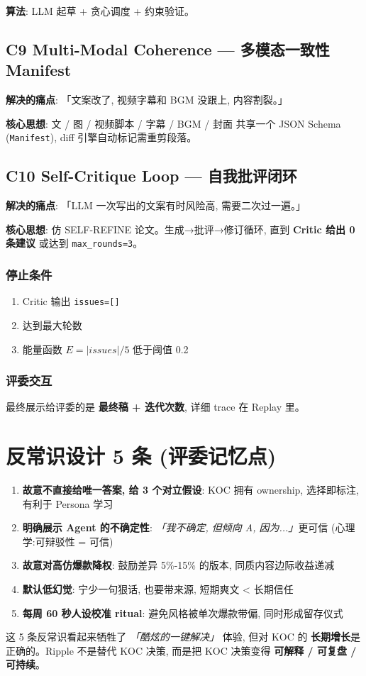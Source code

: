 \textbf{算法}: LLM 起草 + 贪心调度 + 约束验证。

\subsection{C9 Multi-Modal Coherence — 多模态一致性 Manifest}

\textbf{解决的痛点}: 「文案改了, 视频字幕和 BGM 没跟上, 内容割裂。」

\textbf{核心思想}: 文 / 图 / 视频脚本 / 字幕 / BGM / 封面 共享一个 JSON Schema (\texttt{Manifest}), diff 引擎自动标记需重剪段落。

\subsection{C10 Self-Critique Loop — 自我批评闭环}

\textbf{解决的痛点}: 「LLM 一次写出的文案有时风险高, 需要二次过一遍。」

\textbf{核心思想}: 仿 SELF-REFINE 论文。生成→批评→修订循环, 直到 \textbf{Critic 给出 0 条建议} 或达到 \texttt{max\_rounds=3}。

\subsubsection{停止条件}

\begin{enumerate}
    \item Critic 输出 \texttt{issues=[]}
    \item 达到最大轮数
    \item 能量函数 $E = |issues|/5$ 低于阈值 0.2
\end{enumerate}

\subsubsection{评委交互}

最终展示给评委的是 \textbf{最终稿 + 迭代次数}, 详细 trace 在 Replay 里。

\section{反常识设计 5 条 (评委记忆点)}

\begin{enumerate}
    \item \textbf{故意不直接给唯一答案, 给 3 个对立假设}: KOC 拥有 ownership, 选择即标注, 有利于 Persona 学习
    \item \textbf{明确展示 Agent 的不确定性}: \textit{「我不确定, 但倾向 A, 因为...」}更可信 (心理学:可辩驳性 = 可信)
    \item \textbf{故意对高仿爆款降权}: 鼓励差异 5\%-15\% 的版本, 同质内容边际收益递减
    \item \textbf{默认低幻觉}: 宁少一句狠话, 也要带来源, 短期爽文 < 长期信任
    \item \textbf{每周 60 秒人设校准 ritual}: 避免风格被单次爆款带偏, 同时形成留存仪式
\end{enumerate}

\begin{insight}
这 5 条反常识看起来牺牲了 \textit{「酷炫的一键解决」} 体验, 但对 KOC 的 \textbf{长期增长}是正确的。Ripple 不是替代 KOC 决策, 而是把 KOC 决策变得 \textbf{可解释 / 可复盘 / 可持续}。
\end{insight}
